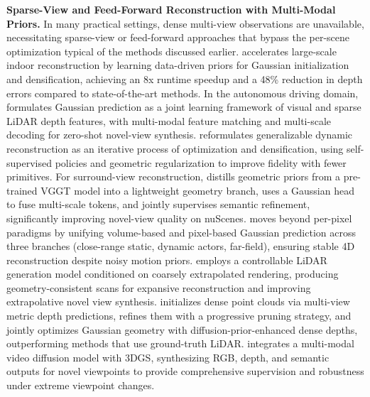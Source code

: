 \documentclass[11pt]{article}
\begin{document}
\textbf{Sparse-View and Feed-Forward Reconstruction with Multi-Modal Priors.} In many practical settings, dense multi-view observations are unavailable, necessitating sparse-view or feed-forward approaches that bypass the per-scene optimization typical of the methods discussed earlier. \cite{ref139} accelerates large-scale indoor reconstruction by learning data-driven priors for Gaussian initialization and densification, achieving an 8x runtime speedup and a 48\% reduction in depth errors compared to state-of-the-art methods. In the autonomous driving domain, \cite{ref235} formulates Gaussian prediction as a joint learning framework of visual and sparse LiDAR depth features, with multi-modal feature matching and multi-scale decoding for zero-shot novel-view synthesis. \cite{ref236} reformulates generalizable dynamic reconstruction as an iterative process of optimization and densification, using self-supervised policies and geometric regularization to improve fidelity with fewer primitives. For surround-view reconstruction, \cite{ref237} distills geometric priors from a pre-trained VGGT model into a lightweight geometry branch, uses a Gaussian head to fuse multi-scale tokens, and jointly supervises semantic refinement, significantly improving novel-view quality on nuScenes. \cite{ref238} moves beyond per-pixel paradigms by unifying volume-based and pixel-based Gaussian prediction across three branches (close-range static, dynamic actors, far-field), ensuring stable 4D reconstruction despite noisy motion priors. \cite{ref239} employs a controllable LiDAR generation model conditioned on coarsely extrapolated rendering, producing geometry-consistent scans for expansive reconstruction and improving extrapolative novel view synthesis. \cite{ref240} initializes dense point clouds via multi-view metric depth predictions, refines them with a progressive pruning strategy, and jointly optimizes Gaussian geometry with diffusion-prior-enhanced dense depths, outperforming methods that use ground-truth LiDAR. \cite{ref241} integrates a multi-modal video diffusion model with 3DGS, synthesizing RGB, depth, and semantic outputs for novel viewpoints to provide comprehensive supervision and robustness under extreme viewpoint changes.
\end{document}
